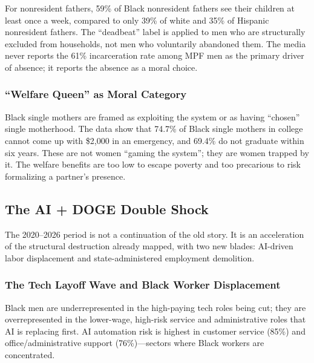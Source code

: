 For nonresident fathers, 59\% of Black nonresident fathers see their children at least once a week, compared to only 39\% of white and 35\% of Hispanic nonresident fathers. The ``deadbeat'' label is applied to men who are structurally excluded from households, not men who voluntarily abandoned them. The media never reports the 61\% incarceration rate among MPF men as the primary driver of absence; it reports the absence as a moral choice.

\subsubsection{``Welfare Queen'' as Moral Category}

Black single mothers are framed as exploiting the system or as having ``chosen'' single motherhood. The data show that 74.7\% of Black single mothers in college cannot come up with \$2,000 in an emergency, and 69.4\% do not graduate within six years. These are not women ``gaming the system''; they are women trapped by it. The welfare benefits are too low to escape poverty and too precarious to risk formalizing a partner's presence.

\subsection{The AI + DOGE Double Shock}

The 2020--2026 period is not a continuation of the old story. It is an acceleration of the structural destruction already mapped, with two new blades: AI-driven labor displacement and state-administered employment demolition.

\subsubsection{The Tech Layoff Wave and Black Worker Displacement}

Black men are underrepresented in the high-paying tech roles being cut; they are overrepresented in the lower-wage, high-risk service and administrative roles that AI is replacing first. AI automation risk is highest in customer service (85\%) and office/administrative support (76\%)---sectors where Black workers are concentrated.


